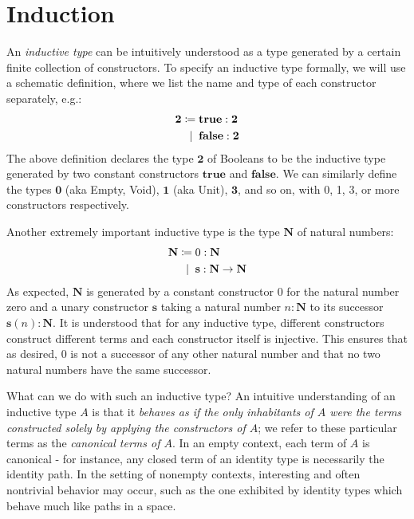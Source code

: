 \newcommand{\zero}{\ensuremath{\mathbf{0}}\xspace}
\newcommand{\one}{\ensuremath{\mathbf{1}}\xspace}
\newcommand{\two}{\ensuremath{\mathbf{2}}\xspace}
\newcommand{\three}{\ensuremath{\mathbf{3}}\xspace}
\newcommand{\nat}{\ensuremath{\mathbf{N}}\xspace}
\newcommand{\true}{\ensuremath{\mathbf{true}}\xspace}
\newcommand{\false}{\ensuremath{\mathbf{false}}\xspace}
\newcommand{\rec}{\ensuremath{\mathbf{rec}}\xspace}
\newcommand{\z}{\ensuremath{0}\xspace}
\newcommand{\s}{\ensuremath{\mathbf{s}}\xspace}
\newcommand{\alt}{\;|\;\;}
\newcommand{\der}{\vdash}

\chapter{Induction}
\label{cha:induction}


An \emph{inductive type} can be intuitively understood as a type generated by a certain finite collection of constructors. To specify an inductive type formally,
we will use a schematic definition, where we list the name and type of each constructor separately, e.g.:
\begin{align*}
  \two \defeq \; & \true : \two \\
         \alt & \false : \two
\end{align*}
The above definition declares the type $\two$ of Booleans to be the inductive type generated by two constant constructors $\true$ and $\false$. We can similarly define the types $\zero$ (aka Empty, Void), $\one$ (aka Unit), $\three$, and so on, with 0, 1, 3, or more constructors respectively. 

Another extremely important inductive type is the type $\nat$ of natural numbers:  
\begin{align*}
  \nat \defeq \; & \z : \nat \\
        \alt & \s : \nat \to \nat 
\end{align*}
As expected, $\nat$ is generated by a constant constructor $\z$ for the natural number zero and a unary constructor $\s$ taking a natural number $n : \nat$ to its successor $\s(n) : \nat$. It is understood that for any inductive type, different constructors construct different terms and each constructor itself is injective. This ensures that as desired, 0 is not a successor of any other natural number and that no two natural numbers have the same successor.

What can we do with such an inductive type? An intuitive understanding of an inductive type $A$ is that it \emph{behaves as if the only inhabitants of $A$ were the terms constructed solely by applying the constructors of $A$}; we refer to these particular terms as the \emph{canonical terms of $A$}. In an empty context,
each term of $A$ is canonical - for instance, any closed term of an identity type is necessarily the identity path. In the setting of nonempty contexts,  
interesting and often nontrivial behavior may occur, such as the one exhibited by identity types which behave much like paths in a space.

